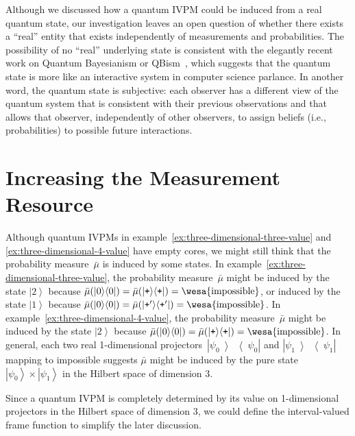 \documentclass{article}
\theoremstyle{remark}
\newcommand{\imposs}{{\mbox{\wesa{impossible}}}}
\newcommand{\ket}[1]{{\left\vert{#1}\right\rangle}}
\newcommand{\op}[2]{\ensuremath{\left\vert{#1}\middle\rangle\middle\langle{#2}\right\vert}}
\newcommand{\proj}[1]{\op{#1}{#1}}
\newcommand{\ps}{\texttt{+}}
\begin{document}
Although we discussed how a quantum IVPM could be induced from a real
quantum state, our investigation leaves an open question of whether
there exists a ``real'' entity that exists independently of measurements
and probabilities. The possibility of no ``real'' underlying state
is consistent with the elegantly recent work on Quantum Bayesianism
or QBism~\cite{Fuchs2010,VonBaeyer2016,Fuchs2012}, which suggests
that the quantum state is more like an interactive system in computer
science parlance. In another word, the quantum state is subjective:
each observer has a different view of the quantum system that is consistent
with their previous observations and that allows that observer, independently
of other observers, to assign beliefs (i.e., probabilities) to possible
future interactions.

\newpage{}%

\printbibliography

\appendix

\section{Increasing the Measurement Resource}

Although quantum IVPMs in example~\ref{ex:three-dimensional-three-value}
and \ref{ex:three-dimensional-4-value} have empty cores, we might
still think that the probability measure~$\bar{\mu}$ is induced
by some states. In example~\ref{ex:three-dimensional-three-value},
the probability measure~$\bar{\mu}$ might be induced by the state
$\ket{2}$ because $\bar{\mu}(\proj{0})=\bar{\mu}(\proj{\ps})=\imposs$,
or induced by the state $\ket{1}$ because $\bar{\mu}(\proj{0})=\bar{\mu}(\proj{\ps'})=\imposs$.
In example~\ref{ex:three-dimensional-4-value}, the probability measure~$\bar{\mu}$
might be induced by the state $\ket{2}$ because $\bar{\mu}(\proj{0})=\bar{\mu}(\proj{\ps})=\imposs$.
In general, each two real 1-dimensional projectors~$\proj{\psi_{0}}$
and $\proj{\psi_{1}}$ mapping to impossible suggests $\bar{\mu}$
might be induced by the pure state~$\ket{\psi_{0}}\times\ket{\psi_{1}}$
in the Hilbert space of dimension 3.

Since a quantum IVPM is completely determined by its value on 1-dimensional
projectors in the Hilbert space of dimension 3, we could define the
interval-valued frame function to simplify the later discussion.
\end{document}
